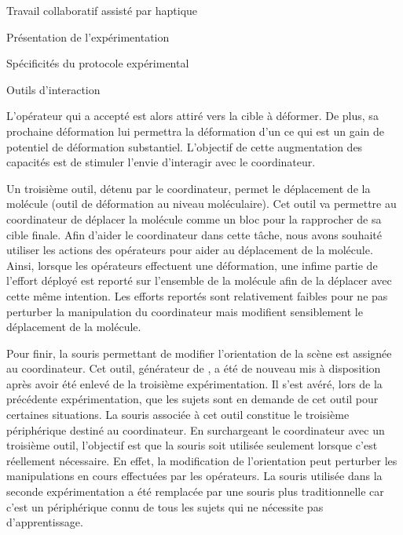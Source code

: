 \documentclass[myfrancais,ngerman,english,french]{mythesis}
\begin{document}
\begin{mychapter}{Travail collaboratif assisté par haptique}
\begin{mysection}{Présentation de l'expérimentation}
\begin{mysubsection}{Spécificités du protocole expérimental}
\begin{mysubsubsection}{Outils d'interaction}
\begin{description}
							L'opérateur qui a accepté est alors attiré vers la cible à déformer.
							De plus, sa prochaine déformation lui permettra la déformation d'un  ce qui est un gain de potentiel de déformation substantiel.
							L'objectif de cette augmentation des capacités est de stimuler l'envie d'interagir avec le coordinateur.
						\item[Outil de manipulation]
							Un troisième outil, détenu par le coordinateur, permet le déplacement de la molécule (outil de déformation au niveau moléculaire).
							Cet outil va permettre au coordinateur de déplacer la molécule comme un bloc pour la rapprocher de sa cible finale.
							Afin d'aider le coordinateur dans cette tâche, nous avons souhaité utiliser les actions des opérateurs pour aider au déplacement de la molécule.
							Ainsi, lorsque les opérateurs effectuent une déformation, une infime partie de l'effort déployé est reporté sur l'ensemble de la molécule afin de la déplacer avec cette même intention.
							Les efforts reportés sont relativement faibles pour ne pas perturber la manipulation du coordinateur mais modifient sensiblement le déplacement de la molécule.
						\item[Outil d'orientation]
							Pour finir, la souris permettant de modifier l'orientation de la scène est assignée au coordinateur.
							Cet outil, générateur de , a été de nouveau mis à disposition après avoir été enlevé de la troisième expérimentation.
							Il s'est avéré, lors de la précédente expérimentation, que les sujets sont en demande de cet outil pour certaines situations.
							La souris associée à cet outil constitue le troisième périphérique destiné au coordinateur.
							En surchargeant le coordinateur avec un troisième outil, l'objectif est que la souris soit utilisée seulement lorsque c'est réellement nécessaire.
							En effet, la modification de l'orientation peut perturber les manipulations en cours effectuées par les opérateurs.
							La souris \myThreeD utilisée dans la seconde expérimentation a été remplacée par une souris \myUSB plus traditionnelle car c'est un périphérique connu de tous les sujets qui ne nécessite pas d'apprentissage.
					\end{description}
				\end{mysubsubsection}
				\begin{mytable}
					\newcommand{\mytitlecolumn}[2]{%
						\multirow{#1}*{%
}}
\end{mytable}
\end{mysubsection}
\end{mysection}
\end{mychapter}
\end{document}
